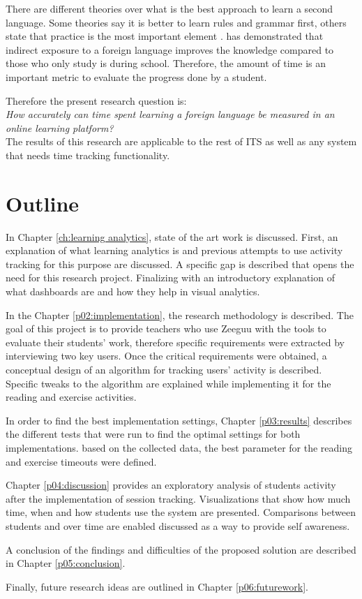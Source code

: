 There are different theories over what is the best approach to learn a second language. Some theories say it is better to learn rules and grammar first, others state that practice is the most important element \cite{Ellis1993}. \citeauthor{Kuppens2010} has demonstrated that indirect exposure to a foreign language improves the knowledge compared to those who only study is during school. Therefore, the amount of time is an important metric to evaluate the progress done by a student.

Therefore the present research question is: \\

\emph{How accurately can time spent learning a foreign language be measured in an online learning platform?}\\

The results of this research are applicable to the rest of ITS as well as any system that needs time tracking functionality.

\section{Outline}

In Chapter \ref{ch:learning analytics}, state of the art work is discussed. First, an explanation of what learning analytics is and previous attempts to use activity tracking for this purpose are discussed. A specific gap is described that opens the need for this research project. Finalizing with an introductory explanation of what dashboards are and how they help in visual analytics.

In the Chapter \ref{p02:implementation}, the research methodology is described. The goal of this project is to provide teachers who use Zeeguu with the tools to evaluate their students' work, therefore specific requirements were extracted by interviewing two key users. Once the critical requirements were obtained, a conceptual design of an algorithm for tracking users' activity is described. Specific tweaks to the algorithm are explained while implementing it for the reading and exercise activities.

In order to find the best implementation settings, Chapter \ref{p03:results} describes the different tests that were run to find the optimal settings for both implementations. based on the collected data, the best parameter for the reading and exercise timeouts were defined.

Chapter \ref{p04:discussion} provides an exploratory analysis of students activity after the implementation of session tracking. Visualizations that show how much time, when and how students use the system are presented. Comparisons between students and over time are enabled discussed as a way to provide self awareness.

A conclusion of the findings and difficulties of the proposed solution are described in Chapter \ref{p05:conclusion}.

Finally, future research ideas are outlined in Chapter \ref{p06:futurework}.
